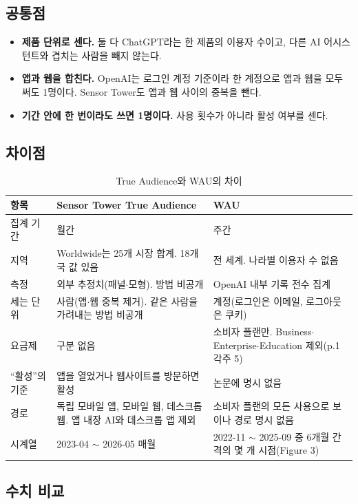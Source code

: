 \documentclass[11pt]{article}
\begin{document}
\subsection{공통점}

\begin{itemize}
  \item \textbf{제품 단위로 센다.} 둘 다 ChatGPT라는 한 제품의 이용자 수이고, 다른 AI 어시스턴트와 겹치는 사람을 빼지 않는다.
  \item \textbf{앱과 웹을 합친다.} OpenAI는 로그인 계정 기준이라 한 계정으로 앱과 웹을 모두 써도 1명이다. Sensor Tower도 앱과 웹 사이의 중복을 뺀다.
  \item \textbf{기간 안에 한 번이라도 쓰면 1명이다.} 사용 횟수가 아니라 활성 여부를 센다.
\end{itemize}

\subsection{차이점}

\begin{longtable}{L{2.6cm}L{6.4cm}L{6.4cm}}
\caption{True Audience와 WAU의 차이}\label{tab:tawau-def}\\
\toprule
항목 & Sensor Tower True Audience & \citeauthor{chatterji-2025-how-people-use-chatgpt} WAU \\
\midrule
\endhead
집계 기간 & 월간 & 주간 \\
지역 & Worldwide는 25개 시장 합계. 18개국 값 있음 & 전 세계. 나라별 이용자 수 없음 \\
측정 & 외부 추정치(패널$\cdot$모형). 방법 비공개 & OpenAI 내부 기록 전수 집계 \\
세는 단위 & 사람(앱$\cdot$웹 중복 제거). 같은 사람을 가려내는 방법 비공개 & 계정(로그인은 이메일, 로그아웃은 쿠키) \\
요금제 & 구분 없음 & 소비자 플랜만. Business$\cdot$Enterprise$\cdot$Education 제외(p.1 각주 5) \\
``활성''의 기준 & 앱을 열었거나 웹사이트를 방문하면 활성 & 논문에 명시 없음 \\
경로 & 독립 모바일 앱, 모바일 웹, 데스크톱 웹. 앱 내장 AI와 데스크톱 앱 제외 & 소비자 플랜의 모든 사용으로 보이나 경로 명시 없음 \\
시계열 & 2023-04 $\sim$ 2026-05 매월 & 2022-11 $\sim$ 2025-09 중 6개월 간격의 몇 개 시점(Figure 3) \\
\bottomrule
\end{longtable}

\subsection{수치 비교}
\end{document}
